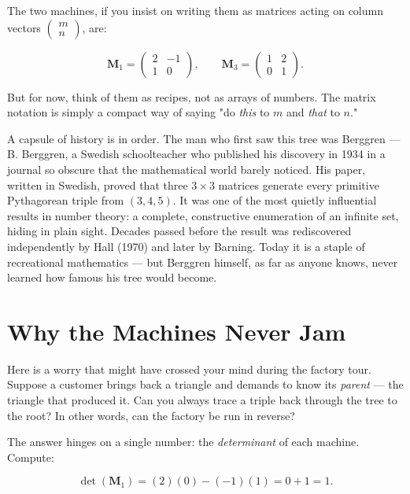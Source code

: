 The two machines, if you insist on writing them as matrices acting on column vectors $\begin{pmatrix} m \\ n \end{pmatrix}$, are:

\[
\mathbf{M}_1 = \begin{pmatrix} 2 & -1 \\ 1 & 0 \end{pmatrix}, \qquad
\mathbf{M}_3 = \begin{pmatrix} 1 & 2 \\ 0 & 1 \end{pmatrix}.
\]

But for now, think of them as recipes, not as arrays of numbers. The matrix notation is simply a compact way of saying "do \textit{this} to $m$ and \textit{that} to $n$."

A capsule of history is in order. The man who first saw this tree was Berggren --- B. Berggren, a Swedish schoolteacher who published his discovery in 1934 in a journal so obscure that the mathematical world barely noticed. His paper, written in Swedish, proved that three $3 \times 3$ matrices generate every primitive Pythagorean triple from $(3, 4, 5)$. It was one of the most quietly influential results in number theory: a complete, constructive enumeration of an infinite set, hiding in plain sight. Decades passed before the result was rediscovered independently by Hall (1970) and later by Barning. Today it is a staple of recreational mathematics --- but Berggren himself, as far as anyone knows, never learned how famous his tree would become.


\bigskip


\section{Why the Machines Never Jam}

Here is a worry that might have crossed your mind during the factory tour. Suppose a customer brings back a triangle and demands to know its \textit{parent} --- the triangle that produced it. Can you always trace a triple back through the tree to the root? In other words, can the factory be run in reverse?

The answer hinges on a single number: the \textit{determinant} of each machine. Compute:

\[
\det(\mathbf{M}_1) = (2)(0) - (-1)(1) = 0 + 1 = 1.
\]

